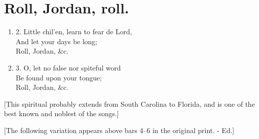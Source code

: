 \documentclass[a5paper,10pt]{book}
\begin{document}
\newenvironment{stanza}
{
  \begin{enumerate}
  \stanzafont
}
{
  \end{enumerate}
}

\newenvironment{extra}
{
  \setlength{\parindenttmp}{\parindent}
  \setlength{\parindent}{\parindentsave}
  \small
}
{
  \setlength{\parindent}{\parindenttmp}
}





\section{Roll, Jordan, roll.}
\thispagestyle{empty}

\begin{song}

\end{song}


\begin{stanza}
\item[2.]
  Little chil'en, learn to fear de Lord, \\
  And let your days be long; \\
  Roll, Jordan, \&c.

\item[3.]
  O, let no false nor spiteful word \\
  Be found upon your tongue; \\
  Roll, Jordan, \&c.
\end{stanza}

\begin{extra}
  [This spiritual probably extends from South Carolina to Florida, and
    is one of the best known and noblest of the songs.]
  
  [The following variation appears above bars 4--6 in the original
    print. - Ed.]

  \medskip
\end{extra}
\end{document}
